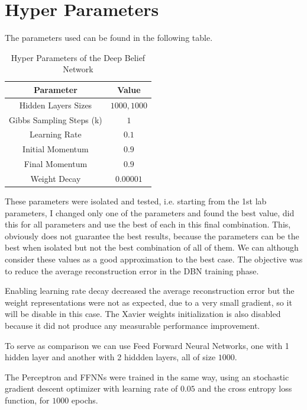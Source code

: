 \documentclass[a4paper, 11pt]{article}
\begin{document}
	
	\section{Hyper Parameters}
		The parameters used can be found in the following table.
		\begin{table}[H]
			\centering
			\begin{tabular}{|c|c|}
				\hline
				\textbf{Parameter} 		& \textbf{Value} 	\\ \hline
				Hidden Layers Sizes 	& $ 1000,1000 $    	\\ \hline
				Gibbs Sampling Steps (k)&  $ 1 $      		\\ \hline
				Learning Rate			&  $ 0.1 $     		\\ \hline
				Initial Momentum		&  $ 0.9 $    		\\ \hline
				Final Momentum			&  $ 0.9 $    		\\ \hline
				Weight Decay			&  $ 0.00001 $      \\ \hline
			\end{tabular}
			\caption{Hyper Parameters of the Deep Belief Network}
			\label{tab:pars}
		\end{table}
		
		These parameters were isolated and tested, i.e. starting from the 1st lab parameters, I changed only one of the parameters and found the best value, did this for all parameters and use the best of each in this final combination.
		This, obviously does not guarantee the best results, because the parameters can be the best when isolated but not the best combination of all of them.
		We can although consider these values as a good approximation to the best case.
		The objective was to reduce the average reconstruction error in the DBN training phase.
		
		Enabling learning rate decay decreased the average reconstruction error but the weight representations were not as expected, due to a very small gradient, so it will be disable in this case.	
		The Xavier weights initialization is also disabled because it did not produce any measurable performance improvement.
		
		To serve as comparison we can use Feed Forward Neural Networks, one with 1 hidden layer and another with 2 hiddden layers, all of size $ 1000 $.
		
		The Perceptron and FFNNs were trained in the same way, using an stochastic gradient descent optimizer with learning rate of $ 0.05 $ and the cross entropy loss function, for $ 1000 $ epochs. 
				
\end{document}
